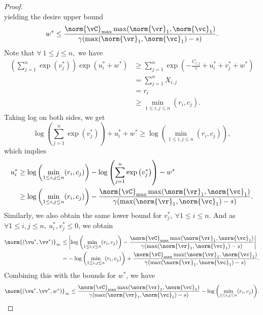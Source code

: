 \begin{proof}
\begin{equation*}
    \end{equation*}
    yielding the desire upper bound 
    \begin{equation*}
        w^\ast \leq \frac{\norm{\vC}_{\max} \max(\norm{\vr}_1, \norm{\vc}_1)}{\gamma (\max(\norm{\vr}_1, \norm{\vc}_1)-s)}.
    \end{equation*}
    Note that $\forall \: 1 \leq j \leq n,$ we have
    \begin{align*}
        \left( \sum^n_{j=1} \exp \left( v^\ast_j \right) \right) \exp \left( u^\ast_i + w^\ast \right) &\geq \sum^n_{j=1} \exp \left( - \frac{C_{i,j}}{\gamma} + u^\ast_i + v^\ast_j + w^\ast \right) \\
        &= \sum^n_{j=1} X_{i,j} \\
        &= r_i \\
        &\geq \min_{1 \leq i,j \leq n} (r_i, c_j).
    \end{align*}
    Taking log on both sides, we get
    \begin{equation*}
        \log \left( \sum^n_{j=1} \exp \left( v^\ast_j \right) \right) + u^\ast_i + w^\ast \geq \log{ \left( \min_{1 \leq i,j \leq n} (r_i, c_j) \right)},
    \end{equation*}
    which implies
    \begin{align*}
        u^\ast_i &\geq \log{ \left( \min_{1 \leq i,j \leq n} (r_i, c_j) \right)} - \log \left( \sum^n_{j=1} \exp \left( v^\ast_j \right) \right) - w^\ast \\
        &\geq \log{ \left( \min_{1 \leq i,j \leq n} (r_i, c_j) \right)} - \frac{\norm{\vC}_{\max} \max(\norm{\vr}_1, \norm{\vc}_1)}{\gamma (\max(\norm{\vr}_1, \norm{\vc}_1)-s)}.
    \end{align*}
    Similarly, we also obtain the same lower bound for $v^\ast_j, 
    \: \forall 1 \leq i \leq n$. And as $\forall 1 \leq i,j \leq n, \: u^\ast_i, v^\ast_j \leq 0 $, we obtain 
    \begin{align*}
        \norm{(\vu^\ast,\vv^\ast)}_\infty &\leq \left| \log{ \left( \min_{1 \leq i,j \leq n} (r_i, c_j) \right)} - \frac{\norm{\vC}_{\max} \max(\norm{\vr}_1, \norm{\vc}_1)}{\gamma (\max(\norm{\vr}_1, \norm{\vc}_1)-s)} \right| \\
        &= - \log{ \left( \min_{1 \leq i,j \leq n} (r_i, c_j) \right)} + \frac{\norm{\vC}_{\max} \max(\norm{\vr}_1, \norm{\vc}_1)}{\gamma (\max(\norm{\vr}_1, \norm{\vc}_1)-s)}.
    \end{align*}
    Combining this with the bounds for $w^\ast$, we have 
    \begin{align*}
        \norm{(\vu^\ast,\vv^\ast, w^\ast)}_\infty \leq \frac{\norm{\vC}_{\max} \max(\norm{\vr}_1, \norm{\vc}_1)}{\gamma (\max(\norm{\vr}_1, \norm{\vc}_1)-s)} - \log{ \left( \min_{1 \leq i,j \leq n} (r_i, c_j) \right)}.
    \end{align*}
\end{proof}
